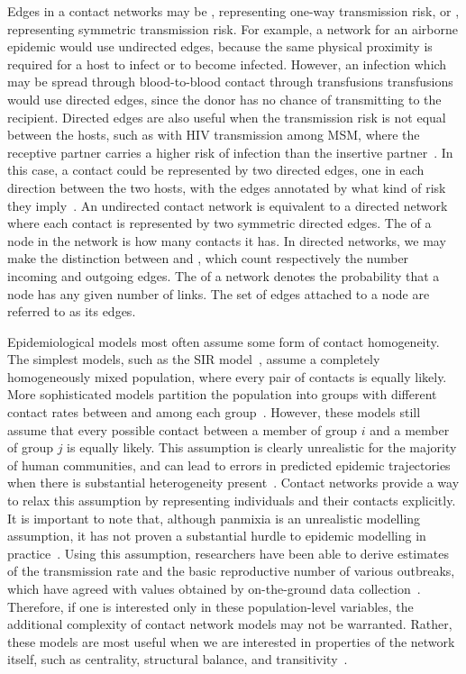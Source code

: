 Edges in a contact networks may be , representing one-way
transmission risk, or , representing symmetric transmission
risk. For example, a network for an airborne epidemic would use undirected
edges, because the same physical proximity is required for a host to infect or
to become infected. However, an infection which may be spread through
blood-to-blood contact through transfusions transfusions would use directed
edges, since the donor has no chance of transmitting to the recipient. Directed
edges are also useful when the transmission risk is not equal between the
hosts, such as with \gls{HIV} transmission among \gls{MSM}, where the receptive
partner carries a higher risk of infection than the insertive
partner~\autocite{baggaley2010hiv}. In this case, a contact could be
represented by two directed edges, one in each direction between the two hosts,
with the edges annotated by what kind of risk they
imply~\autocite{wasserman1994social}. An undirected contact network is
equivalent to a directed network where each contact is represented by two
symmetric directed edges. The  of a node in the network is how
many contacts it has. In directed networks, we may make the distinction between
 and , which count respectively the number
incoming and outgoing edges. The  of a network
denotes the probability that a node has any given number of links. The set of
edges attached to a node are referred to as its  edges.

Epidemiological models most often assume some form of contact homogeneity. The
simplest models, such as the \gls{SIR} model~\autocite{anderson1992infectious},
assume a completely homogeneously mixed population, where every pair of
contacts is equally likely. More sophisticated models partition the population
into groups with different contact rates between and among each
group~\autocite{jacquez1988modeling}. However, these models still assume that
every possible contact between a member of group $i$ and a member of group $j$
is equally likely. This assumption is clearly unrealistic for the majority of
human communities, and can lead to errors in predicted epidemic trajectories
when there is substantial heterogeneity present~\autocite{bansal2007individual,
volz2007susceptible, rolls2015simulation}. Contact networks provide a way to
relax this assumption by representing individuals and their contacts
explicitly. It is important to note that, although panmixia is an unrealistic
modelling assumption, it has not proven a substantial hurdle to epidemic
modelling in practice~\autocite{anderson1992infectious}. Using this assumption,
researchers have been able to derive estimates of the transmission rate and the
basic reproductive number of various outbreaks, which have agreed with values
obtained by on-the-ground data collection~\autocite{stadler2014insights}.
Therefore, if one is interested only in these population-level variables, the
additional complexity of contact network models may not be warranted. Rather,
these models are most useful when we are interested in properties of the
network itself, such as centrality, structural balance, and
transitivity~\autocite{wasserman1994social}.

